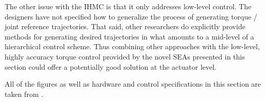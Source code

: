 \begin{refsection}
 The other issue with the IHMC is that it only addresses low-level control.  The designers have not specified how to generalize the process of generating torque / joint reference trajectories.  That said, other researchers do explicitly provide methods for generating desired trajectories in what amounts to a mid-level of a hierarchical control scheme.  Thus combining other approaches with the low-level, highly accuracy torque control provided by the novel SEAs presented in this section could offer a potentially good solution at the actuator level. 
 
All of the figures as well as hardware and control specifications in this section are taken from \cite{ihmc_2009}.
 
\printbibliography[heading=subbibliography]

\end{refsection}


% 





